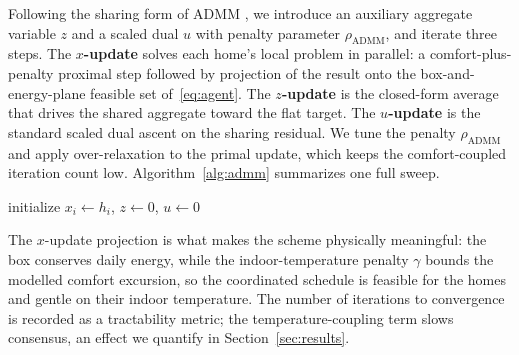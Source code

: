 Following the sharing form of ADMM \cite{boyd2011admm}, we introduce an
auxiliary aggregate variable $z$ and a scaled dual $u$ with penalty parameter
$\rho_{\mathrm{ADMM}}$, and iterate three steps. The \textbf{$x$-update} solves
each home's local problem in parallel: a comfort-plus-penalty proximal step
followed by projection of the result onto the box-and-energy-plane feasible set
of~\eqref{eq:agent}. The \textbf{$z$-update} is the closed-form average that
drives the shared aggregate toward the flat target. The \textbf{$u$-update} is
the standard scaled dual ascent on the sharing residual. We tune the penalty
$\rho_{\mathrm{ADMM}}$ and apply over-relaxation \cite{boyd2011admm} to the primal
update, which keeps the comfort-coupled iteration count low. Algorithm~\ref{alg:admm}
summarizes one full sweep.

\begin{algorithm}[t]
\caption{Sharing-ADMM heating coordination}
\label{alg:admm}
initialize $x_i \leftarrow h_i$, $z \leftarrow 0$, $u \leftarrow 0$\;
\;
\end{algorithm}

The $x$-update projection is what makes the scheme physically meaningful: the box
conserves daily energy, while the indoor-temperature penalty $\gamma$ bounds the
modelled comfort excursion, so the coordinated schedule is feasible for the homes
and gentle on their indoor temperature. The number of iterations to convergence
is recorded as a tractability metric; the temperature-coupling term slows
consensus, an effect we quantify in Section~\ref{sec:results}.


